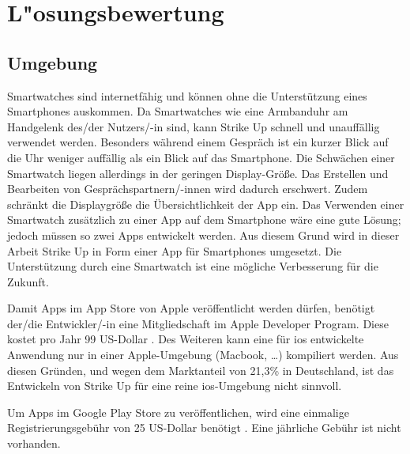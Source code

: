 \chapter{L"osungsbewertung}
\label{ch:loesungsbewertung}

\section{Umgebung}
\label{sec:bewertung_umgebung}

Smartwatches sind internetfähig und können ohne die Unterstützung eines Smartphones auskommen. Da Smartwatches wie eine Armbanduhr am Handgelenk des/der Nutzers/-in sind, kann Strike Up schnell und unauffällig verwendet werden. Besonders während einem Gespräch ist ein kurzer Blick auf die Uhr weniger auffällig als ein Blick auf das Smartphone. \newline
Die Schwächen einer Smartwatch liegen allerdings in der geringen Display-Größe. Das Erstellen und Bearbeiten von Gesprächspartnern/-innen wird dadurch erschwert. Zudem schränkt die Displaygröße die Übersichtlichkeit der App ein. Das Verwenden einer Smartwatch zusätzlich zu einer App auf dem Smartphone wäre eine gute Lösung; jedoch müssen so zwei Apps entwickelt werden. \newline
Aus diesem Grund wird in dieser Arbeit Strike Up in Form einer App für Smartphones umgesetzt. Die Unterstützung durch eine Smartwatch ist eine mögliche Verbesserung für die Zukunft.

Damit Apps im App Store von Apple veröffentlicht werden dürfen, benötigt der/die Entwickler/-in eine Mitgliedschaft im Apple Developer Program. Diese kostet pro Jahr 99 US-Dollar \cite{misc:appledeveloper}.
Des Weiteren kann eine für i\gls{os} entwickelte Anwendung nur in einer Apple-Umgebung (Macbook, \dots) kompiliert werden. \newline
Aus diesen Gründen, und wegen dem Marktanteil von 21,3\% in Deutschland, ist das Entwickeln von Strike Up für eine reine i\gls{os}-Umgebung nicht sinnvoll. \newline

Um Apps im Google Play Store zu veröffentlichen, wird eine einmalige Registrierungsgebühr von 25 US-Dollar benötigt \cite{misc:androiddeveloper}. Eine jährliche Gebühr ist nicht vorhanden.

